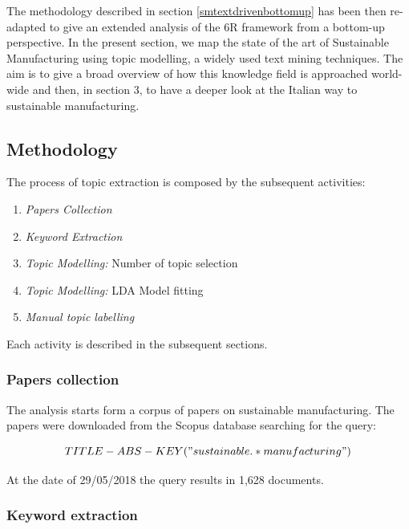 \documentclass[b5paper,]{book}
\providecommand{\tightlist}{%
  \setlength{\itemsep}{0pt}\setlength{\parskip}{0pt}}
\theoremstyle{definition}
\theoremstyle{definition}
\theoremstyle{definition}
\theoremstyle{remark}
\begin{document}
The methodology described in section \ref{smtextdrivenbottomup} has been
then re-adapted to give an extended analysis of the 6R framework from a
bottom-up perspective. In the present section, we map the state of the
art of Sustainable Manufacturing using topic modelling, a widely used
text mining techniques. The aim is to give a broad overview of how this
knowledge field is approached world-wide and then, in section 3, to have
a deeper look at the Italian way to sustainable manufacturing.

\subsection{Methodology}\label{methodology-3}

The process of topic extraction is composed by the subsequent
activities:

\begin{enumerate}
\def\labelenumi{\arabic{enumi}.}
\tightlist
\item
  \emph{Papers Collection}
\item
  \emph{Keyword Extraction}
\item
  \emph{Topic Modelling:} Number of topic selection
\item
  \emph{Topic Modelling:} LDA Model fitting
\item
  \emph{Manual topic labelling}
\end{enumerate}

Each activity is described in the subsequent sections.

\subsubsection*{Papers collection}\label{papers-collection}

The analysis starts form a corpus of papers on sustainable
manufacturing. The papers were downloaded from the Scopus database
searching for the query:

\begin{equation*} 
  TITLE-ABS-KEY("sustainable.*manufacturing")
\end{equation*}

At the date of 29/05/2018 the query results in 1,628 documents.

\subsubsection*{Keyword extraction}\label{keyword-extraction}
\end{document}
